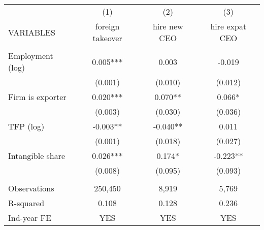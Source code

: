 \begin{tabular}{lccc} \hline
 & (1) & (2) & (3) \\
VARIABLES & foreign takeover & hire new CEO & hire expat CEO \\ \hline
 &  &  &  \\
Employment (log) & 0.005*** & 0.003 & -0.019 \\
 & (0.001) & (0.010) & (0.012) \\
Firm is exporter & 0.020*** & 0.070** & 0.066* \\
 & (0.003) & (0.030) & (0.036) \\
TFP (log) & -0.003** & -0.040** & 0.011 \\
 & (0.001) & (0.018) & (0.027) \\
Intangible share & 0.026*** & 0.174* & -0.223** \\
 & (0.008) & (0.095) & (0.093) \\
 &  &  &  \\
Observations & 250,450 & 8,919 & 5,769 \\
R-squared & 0.108 & 0.128 & 0.236 \\
 Ind-year FE & YES & YES & YES \\ \hline
\end{tabular}
